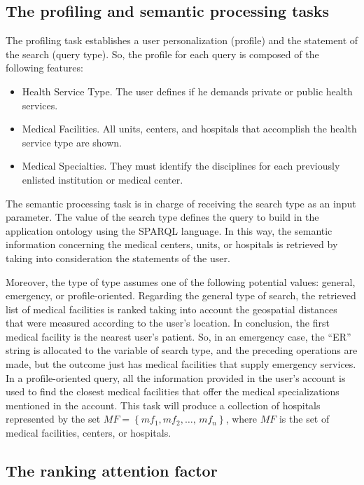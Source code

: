 \documentclass[sustainability,article,submit,pdftex,moreauthors]{Definitions/mdpi}
\begin{document}
\subsection{The profiling and semantic processing tasks}

The profiling task establishes a user personalization (profile) and the statement of the search (query type). So, the profile for each query is composed of the following features:

\begin{itemize}
\item Health Service Type. The user defines if he demands private or public health services.
\item Medical Facilities. All units, centers, and hospitals that accomplish the health service type are shown.
\item Medical Specialties. They must identify the disciplines for each previously enlisted institution or medical center.
\end{itemize}

The semantic processing task is in charge of receiving the search type as an input parameter. The value of the search type defines the query to build in the application ontology using the SPARQL language. In this way, the semantic information concerning the medical centers, units, or hospitals is retrieved by taking into consideration the statements of the user.

Moreover, the type of type assumes one of the following potential values: general, emergency, or profile-oriented. Regarding the general type of search, the retrieved list of medical facilities is ranked taking into account the geospatial distances that were measured according to the user’s location. In conclusion, the first medical facility is the nearest user's patient. So, in an emergency case, the “ER” string is allocated to the variable 
 of search type, and the preceding operations are made, but the outcome just has medical facilities that supply emergency services. In a profile-oriented query, all the information provided in the user's account is used to find the closest medical facilities that offer the medical specializations mentioned in the account. This task will produce a collection of hospitals represented by the set $MF=\left\{mf_{1},mf_{2},\dots,\,mf_{n}\right\}$, where $MF$ is the set of medical facilities, centers, or hospitals. 

\subsection{The ranking attention factor}
\end{document}
